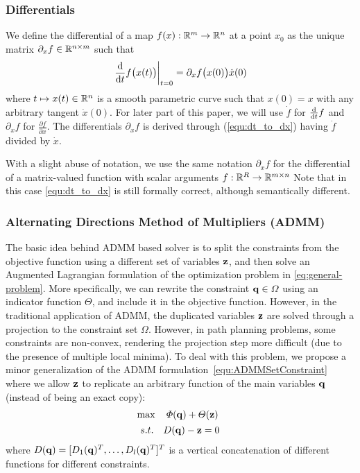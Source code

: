 \documentclass[journal]{IEEEtran}  %
\begin{document}
\subsubsection{Differentials}
We define the differential of a map $f(x):\mathbb{R}^{m}{}\to\mathbb{R}^{n}{}$ at a point $x_0$ as the unique matrix $\partial_x f \in\mathbb{R}^{n\times m}{}$ such that
\begin{equation}\label{equ:dt_to_dx}
  \left.\frac{\mathrm{d} }{\mathrm{d} t} f\bigl(x(t)\bigr)\right|_{t=0}=\partial_x f\bigl(x(0)\bigr) \dot{x}(0)
\end{equation}
where $t\mapsto x(t)\in\mathbb{R}^{n}{}$ is a smooth parametric curve such that $x(0)=x$ with any arbitrary tangent $\dot{x}(0)$. For later part of this paper, we will use $\dot f$ for $\frac{\mathrm{d} }{\mathrm{d} t} f$ and $\partial_x f$ for $\frac{\partial f}{\partial x}$. The differentials $\partial_x f$ is derived through (\ref{equ:dt_to_dx}) having $\dot f$ divided by $\dot x$.

With a slight abuse of notation, we use the same notation $\partial_xf$ for the differential of a matrix-valued function with scalar arguments $f:\mathbb{R}^{R}{}\to\mathbb{R}^{m\times n}{}$  Note that in this case \eqref{equ:dt_to_dx} is still formally correct, although semantically different.

\subsubsection{Alternating Directions Method of Multipliers (ADMM)}\label{chapter:ADMM review}
The basic idea behind ADMM based solver \cite{zyang} is to split the constraints from the objective function using a different set of variables $\mathbf{z}$, and then solve an Augmented Lagrangian formulation of the optimization problem in \eqref{eq:general-problem}.
More specifically, we can rewrite the constraint $\mathbf{q}\in\varOmega$ using an indicator function $\varTheta$, and include it in the objective function. However, in the traditional application of ADMM, the duplicated variables $\mathbf{z}$ are solved through a projection to the constraint set $\Omega$. However, in path planning problems, some constraints are non-convex, rendering the projection step more difficult (due to the presence of multiple local minima).
To deal with this problem, we propose a minor generalization of the ADMM formulation~\eqref{equ:ADMMSetConstraint} where we allow $\mathbf{z}$ to replicate an arbitrary function of the main variables $\mathbf{q}$ (instead of being an exact copy): 
\begin{equation}\label{eq:ADMMSetConstraint_modified}
	\begin{aligned}
		&\max\quad \varPhi(\vq)+\varTheta(\vz) \\
		& \begin{array}{r@{\quad}c}
			s.t.& D(\vq)-\vz=0
		\end{array} 
	\end{aligned}
\end{equation}
where $D(\mathbf{q})= [D_1(\mathbf{q})^T,\dots,D_l(\mathbf{q})^T]^T$ is a vertical concatenation of different functions for different constraints.
\end{document}
